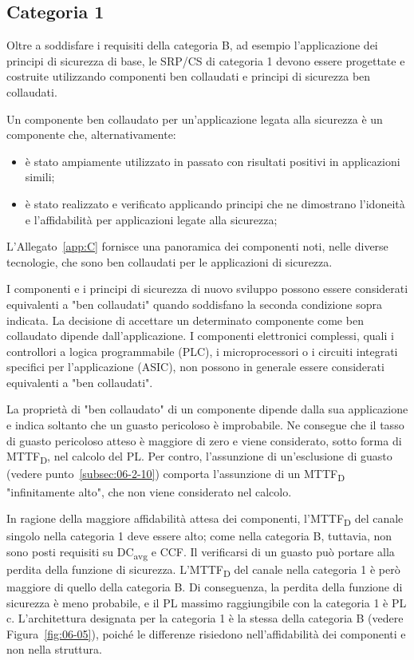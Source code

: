 \subsection{Categoria 1}
\label{subsec:06-2-4}
Oltre a soddisfare i requisiti della categoria B, ad esempio l'applicazione dei principi di sicurezza di base, le SRP/CS di categoria 1 devono essere progettate e costruite utilizzando componenti ben collaudati e principi di sicurezza ben collaudati.

Un componente ben collaudato per un'applicazione legata alla sicurezza è un componente che, alternativamente:
\begin{itemize}
    \item è stato ampiamente utilizzato in passato con risultati positivi in applicazioni simili;
    \item è stato realizzato e verificato applicando principi che ne dimostrano l'idoneità e l'affidabilità per applicazioni legate alla sicurezza;
\end{itemize}

L'Allegato~\ref{app:C} fornisce una panoramica dei componenti noti, nelle diverse tecnologie, che sono ben collaudati per le applicazioni di sicurezza.

I componenti e i principi di sicurezza di nuovo sviluppo possono essere considerati equivalenti a "ben collaudati" quando soddisfano la seconda condizione sopra indicata. La decisione di accettare un determinato componente come ben collaudato dipende dall'applicazione. I componenti elettronici complessi, quali i controllori a logica programmabile (PLC), i microprocessori o i circuiti integrati specifici per l'applicazione (ASIC), non possono in generale essere considerati equivalenti a "ben collaudati".

La proprietà di "ben collaudato" di un componente dipende dalla sua applicazione e indica soltanto che un guasto pericoloso è improbabile. Ne consegue che il tasso di guasto pericoloso atteso è maggiore di zero e viene considerato, sotto forma di MTTF\textsubscript{D}, nel calcolo del PL. Per contro, l'assunzione di un'esclusione di guasto (vedere punto~\ref{subsec:06-2-10}) comporta l'assunzione di un MTTF\textsubscript{D} "infinitamente alto", che non viene considerato nel calcolo.

In ragione della maggiore affidabilità attesa dei componenti, l'MTTF\textsubscript{D} del canale singolo nella categoria 1 deve essere alto; come nella categoria B, tuttavia, non sono posti requisiti su DC\textsubscript{avg} e CCF. Il verificarsi di un guasto può portare alla perdita della funzione di sicurezza. L'MTTF\textsubscript{D} del canale nella categoria 1 è però maggiore di quello della categoria B. Di conseguenza, la perdita della funzione di sicurezza è meno probabile, e il PL massimo raggiungibile con la categoria 1 è PL c.
L'architettura designata per la categoria 1 è la stessa della categoria B (vedere Figura~\ref{fig:06-05}), poiché le differenze risiedono nell'affidabilità dei componenti e non nella struttura.


